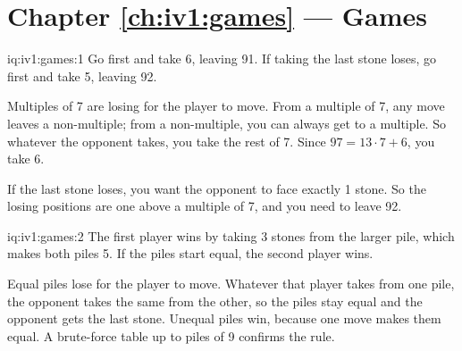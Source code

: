 \section*{Chapter \ref{ch:iv1:games} --- Games}

\begin{solution}{iq:iv1:games:1}
Go first and take 6, leaving 91. If taking the last stone loses, go first and take 5, leaving 92.

Multiples of 7 are losing for the player to move. From a multiple of 7, any move leaves a non-multiple; from a non-multiple, you can always get to a multiple. So whatever the opponent takes, you take the rest of 7. Since $97 = 13 \cdot 7 + 6$, you take 6.

If the last stone loses, you want the opponent to face exactly 1 stone. So the losing positions are one above a multiple of 7, and you need to leave 92.

\end{solution}

\begin{solution}{iq:iv1:games:2}
The first player wins by taking 3 stones from the larger pile, which makes both piles 5. If the piles start equal, the second player wins.

Equal piles lose for the player to move. Whatever that player takes from one pile, the opponent takes the same from the other, so the piles stay equal and the opponent gets the last stone. Unequal piles win, because one move makes them equal. A brute-force table up to piles of 9 confirms the rule.

\end{solution}


